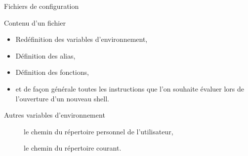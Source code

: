 \begin{frame}{Fichiers de configuration}
  \begin{block}{Contenu d'un fichier }
    \begin{itemize}
    \item Redéfinition des variables d'environnement,
    \item Définition des alias,
    \item Définition des fonctions,
    \item et de façon générale toutes les instructions que l'on souhaite
      évaluer lors de l'ouverture d'un nouveau shell.
    \end{itemize}
  \end{block}
  \begin{center}
  \end{center}
  \begin{alertblock}{Autres variables d'environnement}
    \begin{description}
    \item[] le chemin du répertoire personnel de l'utilisateur,
    \item[] le chemin du répertoire courant.
    \end{description}
  \end{alertblock}

\end{frame}


